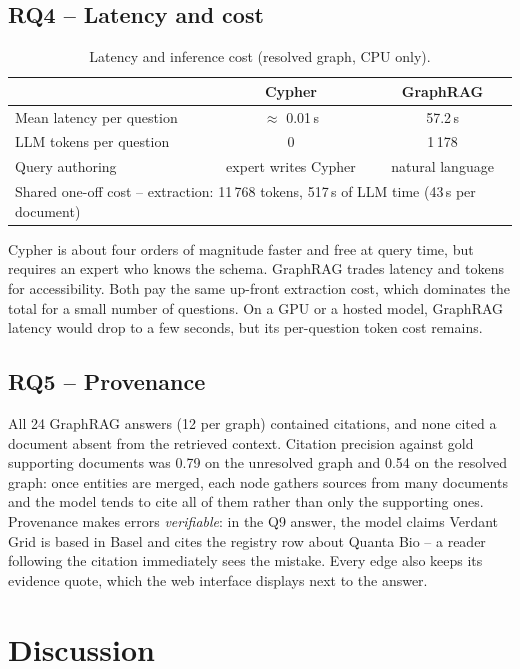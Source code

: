 \documentclass[11pt,a4paper]{report}
\newcommand{\RQ}[1]{\textbf{RQ#1}}
\begin{document}
\section{\RQ{4} -- Latency and cost}
\begin{table}[ht]
\centering
\begin{tabular}{lcc}
\toprule
& \textbf{Cypher} & \textbf{GraphRAG} \\
\midrule
Mean latency per question & $\approx$ 0.01\,s & 57.2\,s \\
LLM tokens per question & 0 & 1\,178 \\
Query authoring & expert writes Cypher & natural language \\
\midrule
\multicolumn{3}{l}{Shared one-off cost -- extraction: 11\,768 tokens, 517\,s of LLM time (43\,s per document)} \\
\bottomrule
\end{tabular}
\caption{Latency and inference cost (resolved graph, CPU only).}
\label{tab:rq4}
\end{table}

Cypher is about four orders of magnitude faster and free at query time, but requires an expert who knows the
schema. GraphRAG trades latency and tokens for accessibility. Both pay the same up-front extraction cost, which
dominates the total for a small number of questions. On a GPU or a hosted model, GraphRAG latency would drop to a few
seconds, but its per-question token cost remains.

\section{\RQ{5} -- Provenance}
All 24 GraphRAG answers (12 per graph) contained citations, and none cited a document absent from the retrieved
context. Citation precision against gold supporting documents was 0.79 on the unresolved graph and 0.54 on the
resolved graph: once entities are merged, each node gathers sources from many documents and the model tends to cite
all of them rather than only the supporting ones. Provenance makes errors \emph{verifiable}: in the Q9 answer, the
model claims Verdant Grid is based in Basel and cites the registry row about Quanta Bio -- a reader following the
citation immediately sees the mistake. Every edge also keeps its evidence quote, which the web interface displays
next to the answer.

\chapter{Discussion}\label{ch:discussion}
\end{document}
